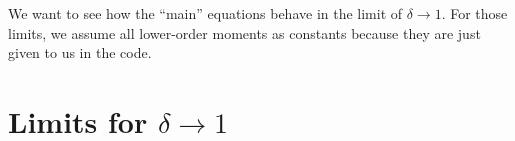 
We want to see how the \enquote{main} equations behave in the limit of $\delta \to 1$.
For those limits, we assume all lower-order moments as constants because they are just given to us in the code.


\section{Limits for \texorpdfstring{$\delta \to 1$}{delta to 1}}
\label{sec:limits-for-delta-to-1}


